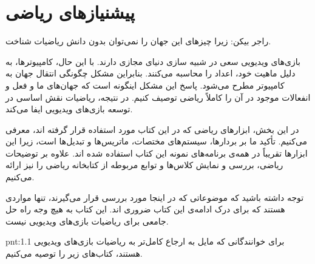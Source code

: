 \newpage

\part{پیشنیاز‌های ریاضی}
{
    \Large
    \begin{spacing}{1.4}
        \textbf{\vspace{3pt}}
        \begin{displayquote}
            راجر بیکن: زیرا چیزهای این جهان را نمی‌توان بدون دانش ریاضیات شناخت.
            \begin{flushleft}
            \end{flushleft}
        \end{displayquote}
        \textbf{\vspace{3pt}}

        بازی‌های ویدیویی سعی در شبیه سازی دنیای مجازی دارند.
        با این حال، کامپیوترها، به دلیل ماهیت خود، اعداد را محاسبه می‌کنند. بنابراین مشکل چگونگی انتقال جهان به کامپیوتر مطرح می‌شود.
        پاسخ این مشکل اینگونه است که جهان‌های ما و فعل و انفعالات موجود در آن را کاملاً ریاضی توصیف کنیم.
        در نتیجه، ریاضیات نقش اساسی در توسعه بازی‌های ویدیویی ایفا می‌کند.

        در این بخش، ابزارهای ریاضی که در این کتاب مورد استفاده قرار گرفته اند، معرفی می‌کنیم. تأکید ما بر بردارها، سیستم‌های مختصات، ماتریس‌ها و تبدیل‌ها است، زیرا این ابزارها تقریباً در همه‌ی برنامه‌های نمونه این کتاب استفاده شده اند.
        علاوه بر توضیحات ریاضی، بررسی و نمایش کلاس‌ها و توابع مربوطه از کتابخانه ریاضی  را نیز ارائه می‌کنیم.

        توجه داشته باشید که موضوعاتی که در اینجا مورد بررسی قرار می‌گیرند، تنها مواردی هستند که برای درک ادامه‌ی این کتاب ضروری اند.
        این کتاب به هیچ وجه راه حل جامعی برای ریاضیات بازی‌های ویدیویی نیست.

        \begin{point}{pnt:1.1}
            \Large
            برای خوانندگانی که مایل به ارجاع کامل‌تر به ریاضیات بازی‌های ویدیویی هستند، کتاب‌های زیر را توصیه می‌کنیم.
            \textbf{\vspace{-20pt}}
        \end{point}


\end{spacing}}

